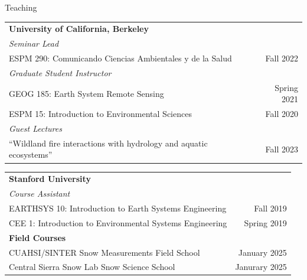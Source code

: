 \documentclass{cv}
\begin{document}
\begin{cSection}{Teaching}
\vspace{1.6em}
\renewcommand{\arraystretch}{1.2}
\begin{tabularx}{.98\textwidth}{X r}
\textbf{University of California, Berkeley } & \\
\textit{Seminar Lead} & \\
ESPM 290: Comunicando Ciencias Ambientales y de la Salud & Fall 2022 \\
\textit{Graduate Student Instructor} & \\
GEOG 185: Earth System Remote Sensing & Spring 2021 \\
ESPM 15: Introduction to Environmental Sciences & Fall 2020 \\
\textit{Guest Lectures} & \\
``Wildland fire interactions with hydrology and aquatic ecosystems'' & Fall 2023 \\
\end{tabularx}
\begin{tabularx}{.98\textwidth}{X r}
\textbf{Stanford University } & \\
\textit{Course Assistant} & \\
EARTHSYS 10: Introduction to Earth Systems Engineering & Fall 2019\\
CEE 1: Introduction to Environmental Systems Engineering & Spring 2019\\
\textbf{Field Courses} & \\
CUAHSI/SINTER Snow Measurements Field School & January 2025 \\
Central Sierra Snow Lab Snow Science School & Janurary 2025\\
\end{tabularx}


\end{cSection}
\end{document}
